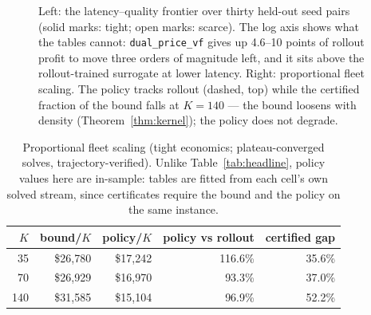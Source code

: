 \documentclass[11pt]{article}
\begin{document}
\begin{figure}[t]
%
\hfill
{}
\caption{Left: the latency--quality frontier over thirty held-out seed
pairs (solid marks: tight; open marks: scarce). The log axis shows what
the tables cannot: \texttt{dual\_price\_vf} gives up 4.6--10 points of
rollout profit to move three orders of magnitude left, and it sits
above the rollout-trained surrogate at lower latency. Right:
proportional fleet scaling. The policy tracks rollout (dashed, top)
while the certified fraction of the bound falls at $K = 140$ --- the
bound loosens with density (Theorem~\ref{thm:kernel}); the policy does
not degrade.}
\label{fig:evidence}
\end{figure}

\begin{table}[t]
\centering
\caption{Proportional fleet scaling (tight economics;
plateau-converged solves, trajectory-verified). Unlike
Table~\ref{tab:headline}, policy
values here are in-sample: tables are fitted from each cell's own
solved stream, since certificates require the bound and the policy on
the same instance.}
\label{tab:scaling}
\small
\begin{tabular}{rrrrr}
\toprule
$K$ & bound/$K$ & policy/$K$ & policy vs rollout & certified gap \\
\midrule
35 & \$26{,}780 & \$17{,}242 & 116.6\% & 35.6\% \\
70 & \$26{,}929 & \$16{,}970 & 93.3\% & 37.0\% \\
140 & \$31{,}585 & \$15{,}104 & 96.9\% & 52.2\% \\
\bottomrule
\end{tabular}
\end{table}
\end{document}
